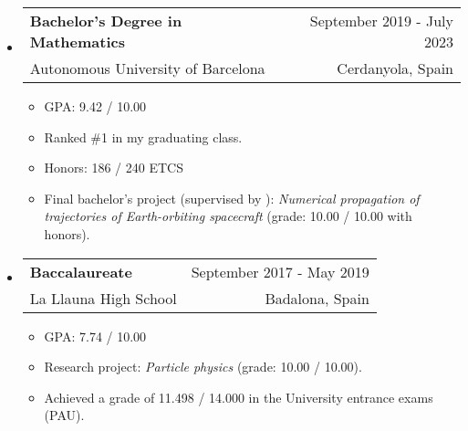 \documentclass[a4paper,11pt]{article}
\makeatletter
\newcommand{\resumeQuadHeading}[4]{
  \item
  \begin{tabular*}{0.96\textwidth}[t]{l@{\extracolsep{\fill}}r}
    \textbf{#1} & \small #2 \\
    \small#3 & \small #4 \\
  \end{tabular*}
}
\newcommand{\resumeHeadingListStart}{
  \begin{itemize}[leftmargin=0.15in, label={}]
}
\newcommand{\resumeHeadingListEnd}{\end{itemize}}
\makeatother
\begin{document}
\resumeHeadingListStart{}
\resumeQuadHeading{Bachelor's Degree in Mathematics}{September 2019 - July 2023}
{Autonomous University of Barcelona}{Cerdanyola, Spain}
\begin{itemize}[leftmargin=3em, itemsep=0.1em, topsep=2pt]
  \item \small GPA: 9.42 / 10.00
  \item \small Ranked \#1 in my graduating class.
  \item \small Honors: 186 / 240 ETCS
  \item \small Final bachelor's project (supervised by \href{http://www.gsd.uab.es/people?controller=member&view=member&id=9&slug=josep-maria}{}): \textit{Numerical propagation of trajectories of Earth-orbiting spacecraft} (grade: 10.00 / 10.00 with honors).
\end{itemize}
\resumeHeadingListEnd{}

\resumeHeadingListStart{}
\resumeQuadHeading{Baccalaureate}{September 2017 - May 2019}
{La Llauna High School}{Badalona, Spain}
\begin{itemize}[leftmargin=3em, itemsep=0.1em, topsep=2pt]
  \item \small GPA: 7.74 / 10.00
  \item \small Research project: \textit{Particle physics} (grade: 10.00 / 10.00).
  \item \small Achieved a grade of 11.498 / 14.000 in the University entrance exams (PAU).
\end{itemize}
\resumeHeadingListEnd{}


\end{document}
